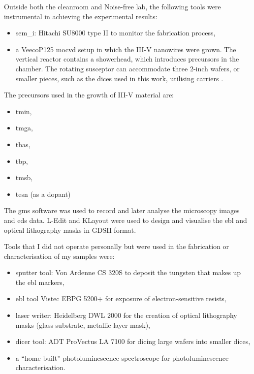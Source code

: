Outside both the cleanroom and Noise-free lab, the following tools were instrumental in achieving the experimental results:
\begin{itemize}
    \item \acf{sem_i}: Hitachi SU8000 type II to monitor the fabrication process,
    \item a VeecoP125 \acf{mocvd} setup in which the III-V nanowires were grown. The vertical reactor contains a showerhead, which introduces precursors in the chamber. The rotating susceptor can accommodate three 2-inch wafers, or smaller pieces, such as the  dices used in this work, utilising carriers \cite{Brugnolotto2023}.
\end{itemize}
\par
The precursors used in the growth of III-V material are:
\begin{itemize}
    \item \acf{tmin},
    \item \acf{tmga},
    \item \acf{tbas},
    \item \acf{tbp},
    \item \acf{tmsb},
    \item \acf{tesn} (as a dopant)
\end{itemize}

The \acf{gms} software was used to record and later analyse the microscopy images and \acs{eds} data. L-Edit and KLayout were used to design and visualise the \acf{ebl} and optical lithography masks in GDSII format. 
\par 
Tools that I did not operate personally but were used in the fabrication or characterisation of my samples were:
\begin{itemize}
    \item sputter tool: Von Ardenne CS 320S to deposit the tungsten that makes up the \acl{ebl} markers,
    \item \acl{ebl} tool Vistec EBPG 5200+ for exposure of electron-sensitive resists,
    \item laser writer: Heidelberg DWL 2000 for the creation of optical lithography masks (glass substrate, metallic layer mask),
    \item dicer tool: ADT ProVectus LA 7100 for dicing large wafers into smaller dices,
    \item a “home-built” photoluminescence spectroscope for photoluminescence characterisation.
\end{itemize}